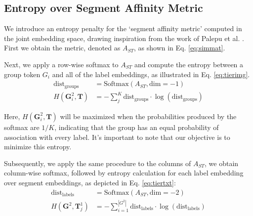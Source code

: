 \subsection{Entropy over Segment Affinity Metric}
\label{sec:tier}
We introduce an entropy penalty for the `segment affinity metric' computed in the joint embedding space, drawing inspiration from the work of Palepu et al. \cite{palepu2022tier}.
First we obtain the metric, denoted as $A_{ST}$, as shown in Eq. \ref{eq:simmat}.

Next, we apply a row-wise softmax to $A_{ST}$ and compute the entropy between a group token \(G_i\) and all of the label embeddings, as illustrated in Eq. \ref{eq:tierimg}.
\begin{equation}
\begin{aligned}
\label{eq:tierimg}
\text{dist}_{\text{groups}} &= \text{Softmax}(A_{ST}, \text{dim}=-1) \\
H(\textbf{G}^2_i, \textbf{T}) &= -\sum_{j}^{K} \text{dist}_{\text{groups}} \cdot \log(\text{dist}_{\text{groups}})
\end{aligned}
\end{equation}

Here, \(H(\textbf{G}^2_i, \textbf{T})\) will be maximized when the probabilities produced by the softmax are \(1/K\), indicating that the group has an equal probability of association with every label. It's important to note that our objective is to minimize this entropy.

Subsequently, we apply the same procedure to the columns of $A_{ST}$, we obtain column-wise softmax, followed by entropy calculation for each label embedding over segment embeddings, as depicted in Eq. \ref{eq:tiertxt}:
\begin{equation}
\begin{aligned}
\label{eq:tiertxt}
\text{dist}_{\text{labels}} &= \text{Softmax}(A_{ST}, \text{dim}=-2) \\
H(\textbf{G}^2, \textbf{T}^1_j) &= -\sum_{i=1}^{|G^2|}  \text{dist}_{\text{labels}} \cdot \log(\text{dist}_{\text{labels}})
\end{aligned}
\end{equation}


